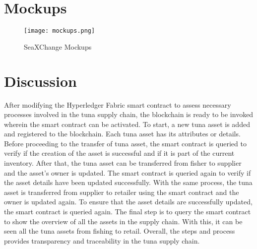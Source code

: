 \section{Mockups}
	\begin{figure}[H]
		\centering
		\texttt{[image: mockups.png]}
		\caption{SeaXChange Mockups}
		\label{fig: eight step}
	\end{figure}

	
\section{Discussion}
After modifying the Hyperledger Fabric smart contract to assess necessary processes involved in the tuna supply chain, the blockchain is ready to be invoked wherein the smart contract can be activated. To start, a new tuna asset is added and registered to the blockchain. Each tuna asset has its attributes or details. Before proceeding to the transfer of tuna asset, the smart contract is queried to verify if the creation of the asset is successful and if it is part of the current inventory. After that, the tuna asset can be transferred from fisher to supplier and the asset's owner is updated. The smart contract is queried again to verify if the asset details have been updated successfully. With the same process, the tuna asset is transferred from supplier to retailer using the smart contract and the owner is updated again. To ensure that the asset details are successfully updated, the smart contract is queried again. The final step is to query the smart contract to show the overview of all the assets in the supply chain. With this, it can be seen all the tuna assets from fishing to retail. Overall, the steps and process provides transparency and traceability in the tuna supply chain.
